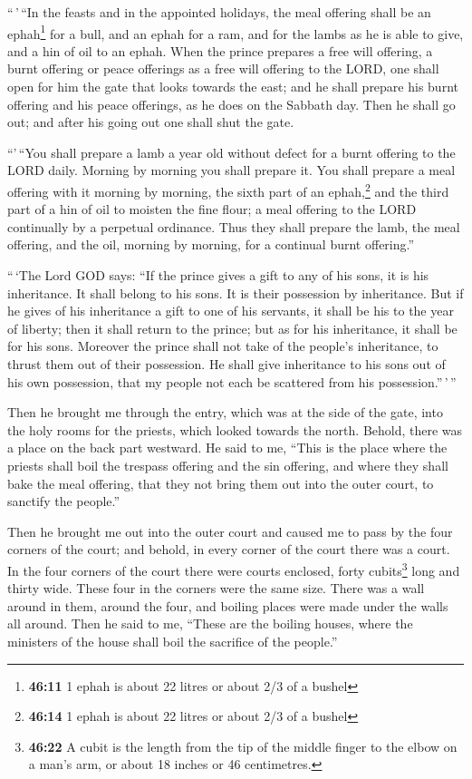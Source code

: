  ``\,'\,``In the feasts and in the appointed holidays,
the meal offering shall be an ephah\footnote{\textbf{46:11} 1 ephah is
  about 22 litres or about 2/3 of a bushel} for a bull, and an ephah for
a ram, and for the lambs as he is able to give, and a hin of oil to an
ephah.  When the prince prepares a free will offering, a
burnt offering or peace offerings as a free will offering to the LORD,
one shall open for him the gate that looks towards the east; and he
shall prepare his burnt offering and his peace offerings, as he does on
the Sabbath day. Then he shall go out; and after his going out one shall
shut the gate.

 ``'\,``You shall prepare a lamb a year old without
defect for a burnt offering to the LORD daily. Morning by morning you
shall prepare it.  You shall prepare a meal offering with
it morning by morning, the sixth part of an ephah,\footnote{\textbf{46:14}
  1 ephah is about 22 litres or about 2/3 of a bushel} and the third
part of a hin of oil to moisten the fine flour; a meal offering to the
LORD continually by a perpetual ordinance.  Thus they
shall prepare the lamb, the meal offering, and the oil, morning by
morning, for a continual burnt offering.''

 ``\,`The Lord GOD says: ``If the prince gives a gift to
any of his sons, it is his inheritance. It shall belong to his sons. It
is their possession by inheritance.  But if he gives of
his inheritance a gift to one of his servants, it shall be his to the
year of liberty; then it shall return to the prince; but as for his
inheritance, it shall be for his sons.  Moreover the
prince shall not take of the people's inheritance, to thrust them out of
their possession. He shall give inheritance to his sons out of his own
possession, that my people not each be scattered from his
possession.''\,'\,''

 Then he brought me through the entry, which was at the
side of the gate, into the holy rooms for the priests, which looked
towards the north. Behold, there was a place on the back part westward.
 He said to me, ``This is the place where the priests
shall boil the trespass offering and the sin offering, and where they
shall bake the meal offering, that they not bring them out into the
outer court, to sanctify the people.''

 Then he brought me out into the outer court and caused
me to pass by the four corners of the court; and behold, in every corner
of the court there was a court.  In the four corners of
the court there were courts enclosed, forty cubits\footnote{\textbf{46:22}
  A cubit is the length from the tip of the middle finger to the elbow
  on a man's arm, or about 18 inches or 46 centimetres.} long and thirty
wide. These four in the corners were the same size. 
There was a wall around in them, around the four, and boiling places
were made under the walls all around.  Then he said to
me, ``These are the boiling houses, where the ministers of the house
shall boil the sacrifice of the people.''

